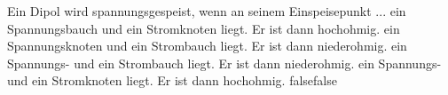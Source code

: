     {Ein Dipol wird spannungsgespeist, wenn an seinem Einspeisepunkt ...}
    {ein Spannungsbauch und ein Stromknoten liegt. Er ist dann hochohmig.}
    {ein Spannungsknoten und ein Strombauch liegt. Er ist dann niederohmig.}
    {ein Spannungs- und ein Strombauch liegt. Er ist dann niederohmig.}
    {ein Spannungs- und ein Stromknoten liegt. Er ist dann hochohmig.}
    {false}{false}
